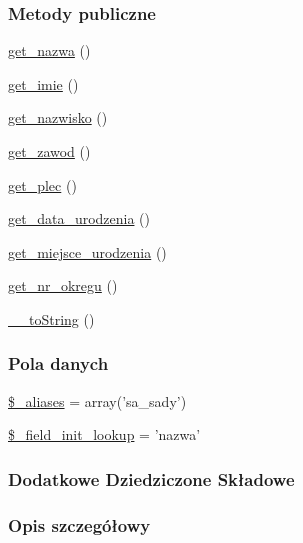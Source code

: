 \subsubsection*{Metody publiczne}
\begin{DoxyCompactItemize}
\item 
\hyperlink{classep___s_a___sad_ac0818f0049d7b84f08f77128f54cee36}{get\-\_\-nazwa} ()
\item 
\hyperlink{classep___s_a___sad_ac4b0c85dc2a130038f2d118dbd0c3d77}{get\-\_\-imie} ()
\item 
\hyperlink{classep___s_a___sad_abdd1d7ff92508da7f748ba1feec97af0}{get\-\_\-nazwisko} ()
\item 
\hyperlink{classep___s_a___sad_af80ca8310b60004454dd02a387deaa2c}{get\-\_\-zawod} ()
\item 
\hyperlink{classep___s_a___sad_ac7f9af5c3fa024e4c26a7b6bd4ce4bb4}{get\-\_\-plec} ()
\item 
\hyperlink{classep___s_a___sad_a880b240cd2d8c336fd1709bf0cb1ae2c}{get\-\_\-data\-\_\-urodzenia} ()
\item 
\hyperlink{classep___s_a___sad_ac57c08ec5e394a19c5bd9280c8376182}{get\-\_\-miejsce\-\_\-urodzenia} ()
\item 
\hyperlink{classep___s_a___sad_a2645a9f0aa5b0ccc482943348c033d0a}{get\-\_\-nr\-\_\-okregu} ()
\item 
\hyperlink{classep___s_a___sad_a7516ca30af0db3cdbf9a7739b48ce91d}{\-\_\-\-\_\-to\-String} ()
\end{DoxyCompactItemize}
\subsubsection*{Pola danych}
\begin{DoxyCompactItemize}
\item 
\hyperlink{classep___s_a___sad_ab4e31d75f0bc5d512456911e5d01366b}{\$\-\_\-aliases} = array('sa\-\_\-sady')
\item 
\hyperlink{classep___s_a___sad_a4a4d54ae35428077a7c61ec8a5139af3}{\$\-\_\-field\-\_\-init\-\_\-lookup} = 'nazwa'
\end{DoxyCompactItemize}
\subsubsection*{Dodatkowe Dziedziczone Składowe}


\subsubsection{Opis szczegółowy}


